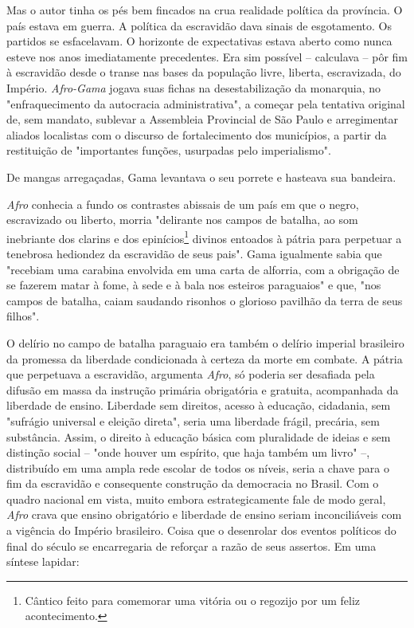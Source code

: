 Mas o autor tinha os pés bem fincados na crua realidade política da
província. O país estava em guerra. A política da escravidão dava sinais
de esgotamento. Os partidos se esfacelavam. O horizonte de expectativas
estava aberto como nunca esteve nos anos imediatamente precedentes. Era
sim possível -- calculava -- pôr fim à escravidão desde o transe nas
bases da população livre, liberta, escravizada, do Império.
\emph{Afro-Gama} jogava suas fichas na desestabilização da monarquia, no
"enfraquecimento da autocracia administrativa", a começar pela tentativa
original de, sem mandato, sublevar a Assembleia Provincial de São Paulo
e arregimentar aliados localistas com o discurso de fortalecimento dos
municípios, a partir da restituição de "importantes funções, usurpadas
pelo imperialismo".

De mangas arregaçadas, Gama levantava o seu porrete e hasteava sua
bandeira.

\emph{Afro} conhecia a fundo os contrastes abissais de um país em que o
negro, escravizado ou liberto, morria "delirante nos campos de batalha,
ao som inebriante dos clarins e dos epinícios\footnote{Cântico feito
  para comemorar uma vitória ou o regozijo por um feliz acontecimento.}
divinos entoados à pátria para perpetuar a tenebrosa hediondez da
escravidão de seus pais". Gama igualmente sabia que "recebiam uma
carabina envolvida em uma carta de alforria, com a obrigação de se
fazerem matar à fome, à sede e à bala nos esteiros paraguaios" e que,
"nos campos de batalha, caiam saudando risonhos o glorioso pavilhão da
terra de seus filhos".

O delírio no campo de batalha paraguaio era também o delírio imperial
brasileiro da promessa da liberdade condicionada à certeza da morte em
combate. A pátria que perpetuava a escravidão, argumenta \emph{Afro}, só
poderia ser desafiada pela difusão em massa da instrução primária
obrigatória e gratuita, acompanhada da liberdade de ensino. Liberdade
sem direitos, acesso à educação, cidadania, sem "sufrágio universal e
eleição direta", seria uma liberdade frágil, precária, sem substância.
Assim, o direito à educação básica com pluralidade de ideias e sem
distinção social -- "onde houver um espírito, que haja também um livro"
--, distribuído em uma ampla rede escolar de todos os níveis, seria a
chave para o fim da escravidão e consequente construção da democracia no
Brasil. Com o quadro nacional em vista, muito embora estrategicamente
fale de modo geral, \emph{Afro} crava que ensino obrigatório e liberdade
de ensino seriam inconciliáveis com a vigência do Império brasileiro.
Coisa que o desenrolar dos eventos políticos do final do século se
encarregaria de reforçar a razão de seus assertos. Em uma síntese
lapidar:

